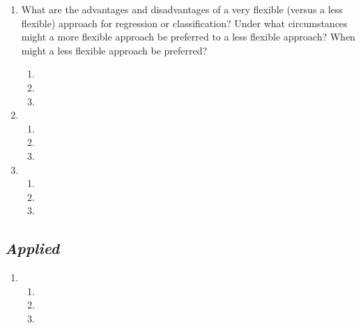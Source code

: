 \documentclass[11pt]{article}
\begin{document}
\begin{enumerate}
  \item What are the advantages and disadvantages of a very flexible (versus
    a less flexible) approach for regression or classification? Under what
    circumstances might a more flexible approach be preferred to a less
    flexible approach? When might a less flexible approach be preferred?
    \begin{enumerate}
      \item
      \item
      \item
    \end{enumerate}

  \item
    \begin{enumerate}
      \item
      \item
      \item
    \end{enumerate}

  \item
    \begin{enumerate}
      \item
      \item
      \item
    \end{enumerate}

\end{enumerate}

\subsection*{\textit{Applied}}

\begin{enumerate}[resume]
  \item
    \begin{enumerate}
      \item
      \item
      \item
    \end{enumerate}
\end{enumerate}
\end{document}
